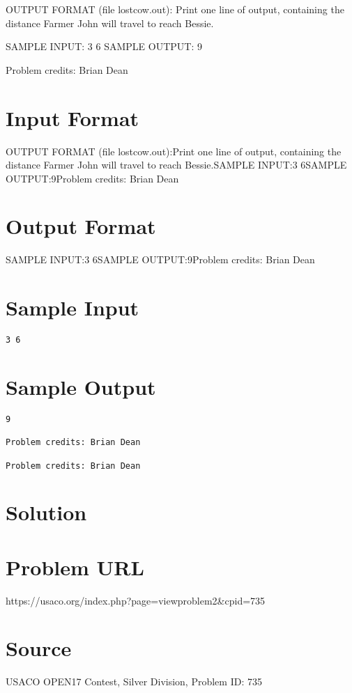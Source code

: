 \documentclass[12pt]{article}
\begin{document}
OUTPUT FORMAT (file lostcow.out):
Print one line of output, containing the distance Farmer John will travel to
reach Bessie.

SAMPLE INPUT:
3 6
SAMPLE OUTPUT: 
9


Problem credits: Brian Dean



\section*{Input Format}
OUTPUT FORMAT (file lostcow.out):Print one line of output, containing the distance Farmer John will travel to
reach Bessie.SAMPLE INPUT:3 6SAMPLE OUTPUT:9Problem credits: Brian Dean

\section*{Output Format}
SAMPLE INPUT:3 6SAMPLE OUTPUT:9Problem credits: Brian Dean

\section*{Sample Input}
\begin{verbatim}
3 6
\end{verbatim}

\section*{Sample Output}
\begin{verbatim}
9

Problem credits: Brian Dean

Problem credits: Brian Dean
\end{verbatim}

\section*{Solution}


\section*{Problem URL}
https://usaco.org/index.php?page=viewproblem2&cpid=735

\section*{Source}
USACO OPEN17 Contest, Silver Division, Problem ID: 735
\end{document}
